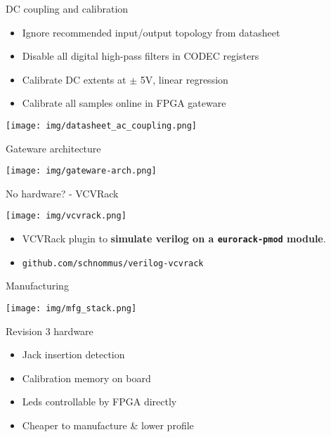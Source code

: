 \documentclass[aspectratio=169]{beamer}
\begin{document}
\begin{frame}{DC coupling and calibration}
    \begin{itemize}
        \item Ignore recommended input/output topology from datasheet
        \item Disable all digital high-pass filters in CODEC registers
        \item Calibrate DC extents at $\pm$ 5V, linear regression
        \item Calibrate all samples online in FPGA gateware
    \end{itemize}
    \begin{center}
        \texttt{[image: img/datasheet\_ac\_coupling.png]}
    \end{center}
\end{frame}

\begin{frame}{Gateware architecture}
    \begin{center}
        \texttt{[image: img/gateware-arch.png]}
    \end{center}
\end{frame}

\begin{frame}{No hardware? - VCVRack}
    \begin{center}
        \texttt{[image: img/vcvrack.png]}
    \end{center}
    \begin{itemize}
        \item VCVRack plugin to \textbf{simulate verilog on a \texttt{eurorack-pmod} module}.
        \item \texttt{github.com/schnommus/verilog-vcvrack}
    \end{itemize}
\end{frame}

\begin{frame}{Manufacturing}
    \begin{center}
        \texttt{[image: img/mfg\_stack.png]}
    \end{center}
    \begin{block}{Revision 3 hardware}
        \begin{itemize}
            \item Jack insertion detection
            \item Calibration memory on board
            \item Leds controllable by FPGA directly
            \item Cheaper to manufacture \& lower profile
        \end{itemize}
    \end{block}
\end{frame}
\end{document}
